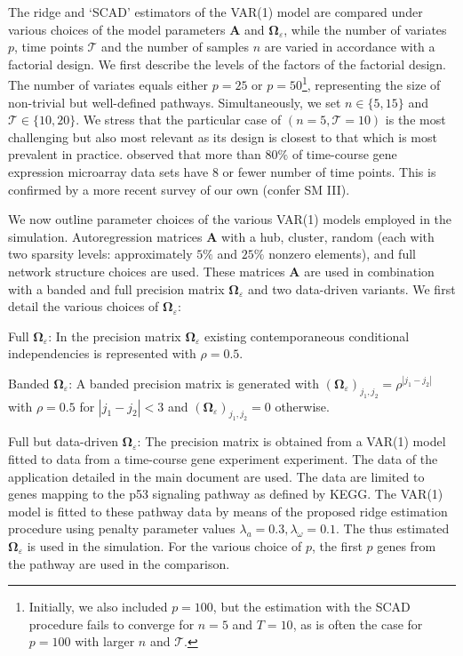 The ridge and `SCAD' estimators of the VAR(1) model are compared under various choices of the model parameters $\mathbf{A}$ and $\mathbf{\Omega}_{\varepsilon}$, while the number of variates $p$, time points $\mathcal{T}$ and the number of samples $n$ are varied in accordance with a factorial design. We first describe the levels of the factors of the factorial design. The number of variates equals either $p=25$ or $p=50$\footnote{Initially, we also included $p=100$, but the estimation with the SCAD procedure fails to converge for $n=5$ and $T=10$, as is often the case for $p=100$ with larger $n$ and $\mathcal{T}$.}, representing the size of non-trivial but well-defined pathways. Simultaneously, we set $n \in \{5, 15\}$ and $\mathcal{T} \in \{10, 20\}$. We stress that the particular case of $(n=5, \mathcal{T}=10)$ is the most challenging but also most relevant as its design is closest to that which is most prevalent in practice. \cite{Ernst2005} observed that more than $80\%$ of time-course gene expression microarray data sets have 8 or fewer number of time points. This is confirmed by a more recent survey of our own (confer SM III).

We now outline parameter choices of the various VAR(1) models employed in the simulation. Autoregression matrices $\mathbf{A}$ with a hub, cluster, random (each with two sparsity levels: approximately $5\%$ and $25\%$ nonzero elements), and full network structure choices are used. These matrices $\mathbf{A}$ are used in combination with a banded and full precision matrix $\mathbf{\Omega}_{\varepsilon}$ and two data-driven variants. We first detail the various choices of $\mathbf{\Omega}_{\varepsilon}$:
\begin{compactitem}
\item Full $\mathbf{\Omega}_{\varepsilon}$: In the precision matrix $\mathbf{\Omega}_{\varepsilon}$ existing contemporaneous conditional independencies is represented with $\rho=0.5$.

\item Banded $\mathbf{\Omega}_{\varepsilon}$: A banded precision matrix is generated with $(\mathbf{\Omega}_{\varepsilon})_{j_1, j_2} = \rho^{|j_1-j_2|}$ with $\rho=0.5$ for $|j_1-j_2|<3$ and $(\mathbf{\Omega}_{\varepsilon})_{j_1, j_2} = 0$ otherwise.

\item Full but data-driven $\mathbf{\Omega}_{\varepsilon}$: The precision matrix is obtained from a VAR(1) model fitted to data from a time-course gene experiment experiment. The data of the application detailed in the main document are used. The data are limited to genes mapping to the p53 signaling pathway as defined by KEGG. The VAR(1) model is fitted to these pathway data by means of the proposed ridge estimation procedure using penalty parameter values $\lambda_a=0.3, \lambda_{\omega}=0.1$. The thus estimated $\boldsymbol{\Omega}_{\varepsilon}$ is used in the simulation. For the various choice of $p$, the first $p$ genes from the pathway are used in the comparison.
\end{compactitem}

